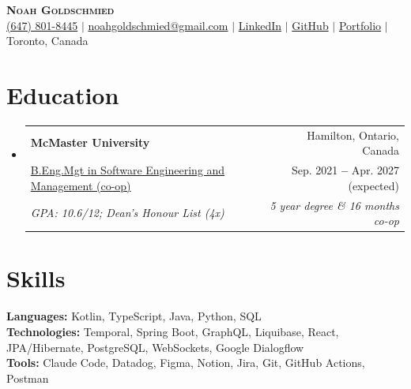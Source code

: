 \documentclass[letterpaper,10pt]{article}
\makeatletter
\newcommand{\resumeEducationHeading}[6]{
  \vspace{-2pt}\item
    \begin{tabular*}{0.97\textwidth}[t]{l@{\extracolsep{\fill}}r}
      \textbf{#1} & #2 \\
      {\small#3} & {\small #4} \\
      \textit{\small#5} & \textit{\small #6} \\
    \end{tabular*}\vspace{-5pt}
}
\newcommand{\resumeSubHeadingListStart}{\begin{itemize}[leftmargin=0.15in, label={}]}
\newcommand{\resumeSubHeadingListEnd}{\end{itemize}}
\makeatother
\begin{document}

\begin{center}
    \textbf{\Huge \scshape Noah Goldschmied} \\ \vspace{1pt}
    \small
    \faPhone \hspace{.5pt} \href{tel:+16478018445}{(647) 801-8445}
    $|$
    \faEnvelope \hspace{.5pt} \href{mailto:noahgoldschmied@gmail.com}{noahgoldschmied@gmail.com}
    $|$
    \faLinkedinSquare \hspace{.5pt} \href{https://www.linkedin.com/in/noah-goldschmied}{LinkedIn}
    $|$
    \faGithub \hspace{.5pt} \href{https://github.com/noahgoldschmied}{GitHub}
    $|$
    \faGlobe \hspace{.5pt} \href{https://noahgoldschmied.com}{Portfolio}
    $|$
    \faMapMarker \hspace{.5pt} {Toronto, Canada}
\end{center}




\section{Education}
  \vspace{1pt}
  \resumeSubHeadingListStart

    \resumeEducationHeading
      {McMaster University}{Hamilton, Ontario, Canada}
      {\href{https://www.eng.mcmaster.ca/cas/degree-options/software-engineering-and-management/}{B.Eng.Mgt in Software Engineering and Management (co-op)}}{Sep. 2021 \textbf{--} Apr. 2027 (expected)}
      {GPA: 10.6/12; Dean's Honour List (4x)}{5 year degree \& 16 months co-op}
  \resumeSubHeadingListEnd


\section{Skills}
  \vspace{0pt}
  \resumeSubHeadingListStart
    \small{\item{
        \textbf{Languages:}{ Kotlin, TypeScript, Java, Python, SQL} \\ \vspace{3pt}
        \textbf{Technologies:}{ Temporal, Spring Boot, GraphQL, Liquibase, React, JPA/Hibernate, PostgreSQL, WebSockets, Google Dialogflow} \\ \vspace{3pt}
        \textbf{Tools:}{ Claude Code, Datadog, Figma, Notion, Jira, Git, GitHub Actions, Postman}
    }}
  \resumeSubHeadingListEnd
\end{document}
